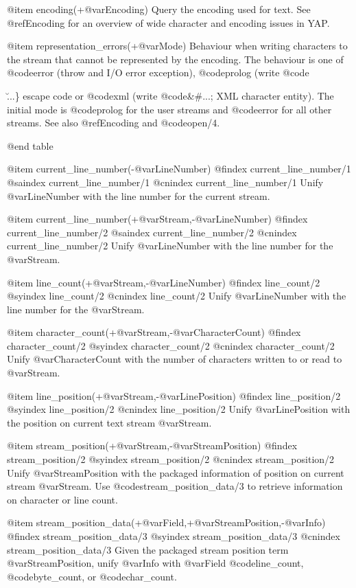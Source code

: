 {{{{{@item encoding(+@var{Encoding})
Query the encoding used for text.  See @ref{Encoding} for an
overview of wide character and encoding issues in YAP.

@item representation_errors(+@var{Mode})
Behaviour when writing characters to the stream that cannot be
represented by the encoding.  The behaviour is one of @code{error}
(throw and I/O error exception), @code{prolog} (write @code{\u...\}
escape code or @code{xml} (write @code{&#...;} XML character entity).
The initial mode is @code{prolog} for the user streams and
@code{error} for all other streams. See also @ref{Encoding} and
@code{open/4}.

@end table

@item current_line_number(-@var{LineNumber})
@findex current_line_number/1
@saindex current_line_number/1
@cnindex current_line_number/1
Unify @var{LineNumber} with the line number for the current stream.

@item current_line_number(+@var{Stream},-@var{LineNumber})
@findex current_line_number/2
@saindex current_line_number/2
@cnindex current_line_number/2
Unify @var{LineNumber} with the line number for the @var{Stream}. 

@item line_count(+@var{Stream},-@var{LineNumber})
@findex line_count/2
@syindex line_count/2
@cnindex line_count/2
Unify @var{LineNumber} with the line number for the @var{Stream}.

@item character_count(+@var{Stream},-@var{CharacterCount})
@findex character_count/2
@syindex character_count/2
@cnindex character_count/2
Unify @var{CharacterCount} with the number of characters written to or
read to @var{Stream}.

@item line_position(+@var{Stream},-@var{LinePosition})
@findex line_position/2
@syindex line_position/2
@cnindex line_position/2
Unify @var{LinePosition} with the position on current text stream
@var{Stream}.

@item stream_position(+@var{Stream},-@var{StreamPosition})
@findex stream_position/2
@syindex stream_position/2
@cnindex stream_position/2
Unify @var{StreamPosition} with the packaged information of position on
current stream @var{Stream}. Use @code{stream_position_data/3} to
retrieve information on character or line count.

@item stream_position_data(+@var{Field},+@var{StreamPosition},-@var{Info})
@findex stream_position_data/3
@syindex stream_position_data/3
@cnindex stream_position_data/3
Given the packaged stream position term @var{StreamPosition}, unify
@var{Info} with @var{Field} @code{line_count}, @code{byte_count}, or
@code{char_count}.

}}}}}}
